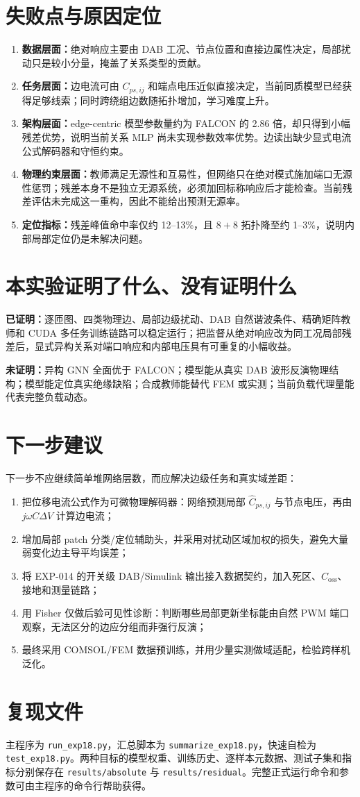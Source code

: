 \documentclass[11pt,a4paper]{ctexart}
\begin{document}
\section{失败点与原因定位}
\begin{enumerate}
 \item \textbf{数据层面：}绝对响应主要由 DAB 工况、节点位置和直接边属性决定，局部扰动只是较小分量，掩盖了关系类型的贡献。
 \item \textbf{任务层面：}边电流可由 $C_{ps,ij}$ 和端点电压近似直接决定，当前同质模型已经获得足够线索；同时跨绕组边数随拓扑增加，学习难度上升。
 \item \textbf{架构层面：}edge-centric 模型参数量约为 FALCON 的 2.86 倍，却只得到小幅残差优势，说明当前关系 MLP 尚未实现参数效率优势。边读出缺少显式电流公式解码器和守恒约束。
 \item \textbf{物理约束层面：}教师满足无源性和互易性，但网络只在绝对模式施加端口无源性惩罚；残差本身不是独立无源系统，必须加回标称响应后才能检查。当前残差评估未完成这一重构，因此不能给出预测无源率。
 \item \textbf{定位指标：}残差峰值命中率仅约 12--13\%，且 $8+8$ 拓扑降至约 1--3\%，说明内部局部定位仍是未解决问题。
\end{enumerate}

\section{本实验证明了什么、没有证明什么}
\textbf{已证明：}逐匝图、四类物理边、局部边级扰动、DAB 自然谐波条件、精确矩阵教师和 CUDA 多任务训练链路可以稳定运行；把监督从绝对响应改为同工况局部残差后，显式异构关系对端口响应和内部电压具有可重复的小幅收益。

\textbf{未证明：}异构 GNN 全面优于 FALCON；模型能从真实 DAB 波形反演物理结构；模型能定位真实绝缘缺陷；合成教师能替代 FEM 或实测；当前负载代理量能代表完整负载动态。

\section{下一步建议}
下一步不应继续简单堆网络层数，而应解决边级任务和真实域差距：
\begin{enumerate}
 \item 把位移电流公式作为可微物理解码器：网络预测局部 $\widehat C_{ps,ij}$ 与节点电压，再由 $j\omega C\Delta V$ 计算边电流；
 \item 增加局部 patch 分类/定位辅助头，并采用对扰动区域加权的损失，避免大量弱变化边主导平均误差；
 \item 将 EXP-014 的开关级 DAB/Simulink 输出接入数据契约，加入死区、$C_{\mathrm{oss}}$、接地和测量链路；
 \item 用 Fisher 仅做后验可见性诊断：判断哪些局部更新坐标能由自然 PWM 端口观察，无法区分的边应分组而非强行反演；
 \item 最终采用 COMSOL/FEM 数据预训练，并用少量实测做域适配，检验跨样机泛化。
\end{enumerate}

\section*{复现文件}
主程序为 \texttt{run\_exp18.py}，汇总脚本为 \texttt{summarize\_exp18.py}，快速自检为 \texttt{test\_exp18.py}。两种目标的模型权重、训练历史、逐样本元数据、测试子集和指标分别保存在 \texttt{results/absolute} 与 \texttt{results/residual}。完整正式运行命令和参数可由主程序的命令行帮助获得。
\end{document}
